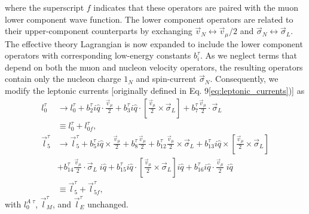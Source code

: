 \documentclass{book}[letterpaper,12pt]
\begin{document}
where the superscript $f$ indicates that these operators are paired with the muon lower component wave function. The lower component operators are related to their upper-component counterparts by exchanging $\vec{v}_N\leftrightarrow \vec{v}_{\mu}/2$ and $\vec{\sigma}_N\leftrightarrow\vec{\sigma}_L$. The effective theory Lagrangian is now expanded to include the lower component operators with corresponding low-energy constants $b_i^{\tau}$. As we neglect terms that depend on both the muon and nucleon velocity operators, the resulting operators contain only the nucleon charge $1_N$ and spin-current $\vec{\sigma}_N$. Consequently, we modify the leptonic currents [originally defined in Eq. 9\ref{eq:leptonic_currents})] as
\begin{equation}
\begin{split}
l_0^{\tau}&\rightarrow l_0^{\tau}+b_2^{\tau}i\hat{q}\cdot\frac{\vec{v}_{\mu}}{2}+b_3^{\tau}i\hat{q}\cdot\left[\frac{\vec{v}_{\mu}}{2}\times\vec{\sigma}_L\right]+b_7^{\tau}\frac{\vec{v}_{\mu}}{2}\cdot\vec{\sigma}_L\\
&\equiv l_0^{\tau}+l_{0f}^{\tau},\\
\vec{l}_5^{\tau}&\rightarrow \vec{l}_5^{\tau}+b_5^{\tau}i\hat{q}\times\frac{\vec{v}_{\mu}}{2}+b_8^{\tau}\frac{\vec{v}_{\mu}}{2}+b_{12}^{\tau}\frac{\vec{v}_{\mu}}{2}\times\vec{\sigma}_L+b_{13}^{\tau}i\hat{q}\times\left[\frac{\vec{v}_{\mu}}{2}\times\vec{\sigma}_L\right]\\&+b_{14}^{\tau}\frac{\vec{v}_{\mu}}{2}\cdot\vec{\sigma}_L\;i\hat{q}
+b_{15}^{\tau}i\hat{q}\cdot\left[\frac{\vec{v}_{\mu}}{2}\times\vec{\sigma}_L\right]i\hat{q}+b_{16}^{\tau}i\hat{q}\cdot\frac{\vec{v}_{\mu}}{2}\;i\hat{q}\\
&\equiv \vec{l}_5^{\tau}+\vec{l}_{5f}^{\tau},
\end{split}
\end{equation}
with $l_0^{A\;\tau}$, $\vec{l}_M^{\tau}$, and $\vec{l}_E^{\tau}$ unchanged.
\end{document}
